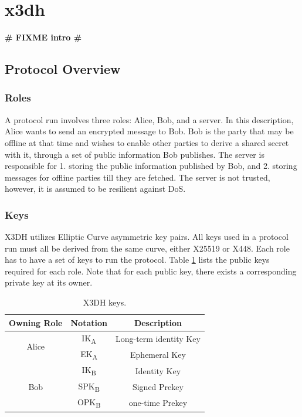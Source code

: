 \section{\acrfull*{x3dh}}
\textbf{\LARGE \# FIXME intro \#}
\label{ch:x3dh}

\subsection{Protocol Overview}
\subsubsection{Roles}
A protocol run involves three roles: Alice, Bob, and a server. In this description, Alice wants to send an encrypted message to Bob. Bob is the party that may be offline at that time and wishes to enable other parties to derive a shared secret with it, through a set of public information Bob publishes. The server is responsible for 1. storing the public information published by Bob, and 2. storing messages for offline parties till they are fetched. The server is not trusted, however, it is assumed to be resilient against DoS. %
\subsubsection{Keys}
X3DH utilizes Elliptic Curve asymmetric key pairs. All keys used in a protocol run must all be derived from the same curve, either X25519 or X448. Each role has to have a set of keys to run the protocol. Table \ref{tab:x3dhkeys} lists the public keys required for each role. Note that for each public key, there exists a corresponding private key at its owner.

\begin{table}
	\centering
	\begin{tabular}{|c||c|c|}
		
		\hline
		Owning Role & Notation				 & Description 			  \\\hline
		\multirow{2}{*}{Alice} & IK\textsubscript{A} 	 & Long-term identity Key \\
		& EK\textsubscript{A} 	 & Ephemeral Key 		  \\\hline
		\multirow{3}{*}{Bob}  & IK\textsubscript{B} 	 & Identity Key 		  \\
		& SPK\textsubscript{B} 	 & Signed Prekey 		  \\
		& OPK\textsubscript{B} 	 & one-time Prekey 		  \\ \hline
		
	\end{tabular}
	\caption{X3DH keys.}
	\label{tab:x3dhkeys}
\end{table}

